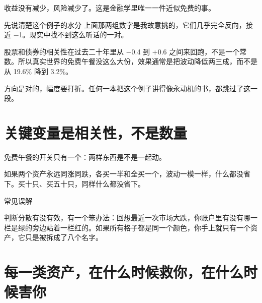 \begin{pullquote}{}
收益没有减少，风险减少了。这是金融学里唯一一件近似免费的事。
\end{pullquote}

\begin{warnbox}{先说清楚这个例子的水分}
上面那两组数字是我故意挑的，它们几乎完全反向，接近 −1。现实中找不到这么听话的一对。

股票和债券的相关性在过去二十年里从 −0.4 到 +0.6 之间来回跑，不是一个常数。所以真实世界的免费午餐没这么大份，效果通常是把波动降低两三成，而不是从 19.6\% 降到 3.2\%。

方向是对的，幅度要打折。任何一本把这个例子讲得像永动机的书，都跳过了这一段。

\end{warnbox}

\section{关键变量是相关性，不是数量}

免费午餐的开关只有一个：两样东西是不是一起动。

如果两个资产永远同涨同跌，各买一半和全买一个，波动一模一样，什么都没省下。买十只、买五十只，同样什么都没省下。

\begin{mythbox}{常见误解}
\end{mythbox}

判断分散有没有效，有一个笨办法：回想最近一次市场大跌，你账户里有没有哪一栏是绿的旁边站着一栏红的。如果所有格子都是同一个颜色，你手上就只有一个资产，它只是被拆成了八个名字。

\section{每一类资产，在什么时候救你，在什么时候害你}

